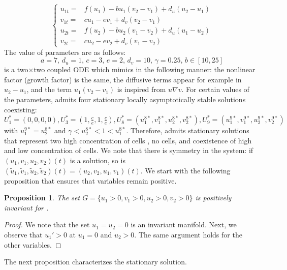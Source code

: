 \documentclass[final,1p,times]{elsarticle}
\newtheorem{prop}[thm]{Proposition}
\begin{document}
\begin{equation}
\label{eq:2times2}
\left \{
\begin{array}{rl}
      u_{1t}=&  f(u_1)-bu_1(v_2-v_1)+d_u(u_2-u_1) \\
      v_{1t}=& cu_1-ev_1+d_v(v_2-v_1)\\
         u_{2t}=&  f(u_2)-bu_2(v_1-v_2)+d_u(u_1-u_2) \\
      v_{2t}=& cu_2-ev_2+d_v(v_1-v_2)
 \end{array}
 \right.
\end{equation}
 The value of parameters are as follows:
\begin{equation}
         a=7, \, d_u=1,\,   c=3, \, e=2,\, d_v=10, \, \gamma=0.25,\, b\in [10,25]
    \label{eq:param-EDO4v}
\end{equation}
 is a two$\times$two coupled ODE  which mimics  in the following manner: the nonlinear factor (growth factor) is the same, the diffusive terms appear for example in  $u_2-u_1$, and the term  $u_1(v_2-v_1)$ is inspired from $u\nabla v$. For certain values of the parameters,  admits  four stationary locally asymptotically stable solutions coexisting: $U_1^*=(0,0,0,0), U_3^*=(1,\frac{c}{e},1,\frac{c}{e}), U_8^*=(u_1^{8*},v_1^{8*},u_2^{8*},v_2^{8*}), U_9^*=(u_1^{9*},v_1^{9*},u_2^{9*},v_2^{9*})$ with  $u_1^{9*}=u_2^{8*}$ and
$\gamma<u_2^{8*}<1<u_1^{8*}$. Therefore,  admits stationary solutions that represent two high concentration of cells , no cells, and coexistence of high and low concentration of cells. We note that there is symmetry in the system: if $(u_1,v_1,u_2,v_2)(t)$ is a solution, so is $(\tilde{u}_1,\tilde{v}_1,\tilde{u}_2,\tilde{v}_2)(t)=(u_2,v_2,u_1,v_1)(t)$. We start with the following proposition that ensures that variables remain positive.
\begin{prop}
 The set $G=\{u_1>0,v_1>0,u_2>0,v_2>0\}$ is positively invariant for . 
\end{prop}
\begin{proof}
    We note that the set $u_1=u_2=0$ is an invariant manifold. Next, we observe that $u_1'>0$ at $u_1=0$ and $u_2>0$. The same argument holds for the other variables.   
\end{proof}
The next proposition characterizes the stationary solution.
\end{document}
